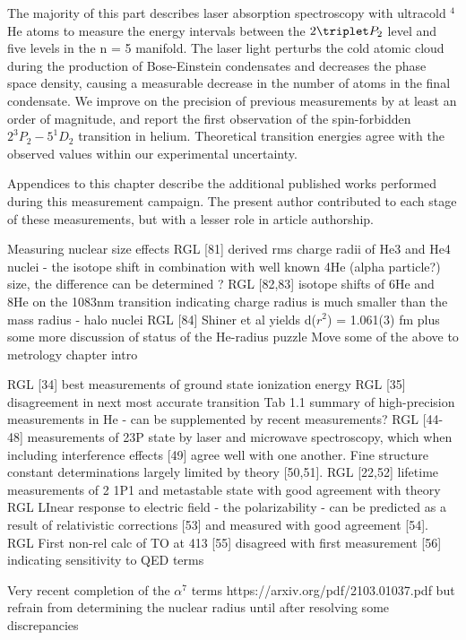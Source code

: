 The majority of this part describes laser absorption spectroscopy with ultracold $^4$He atoms to measure the energy intervals between the $2\triplet P_2$ level and five levels in the n = 5 manifold. The laser light perturbs the cold atomic cloud during the production of Bose-Einstein condensates and decreases the phase space density, causing a measurable decrease in the number of atoms in the final condensate. We improve on the precision of previous measurements by at least an order of magnitude, and report the first observation of the spin-forbidden $2^{3\!}P_2 - 5^{1\!}D_2$ transition in helium. Theoretical transition energies agree with the observed values within our experimental uncertainty.

Appendices to this chapter describe the additional published works performed during this measurement campaign. The present author contributed to each stage of these measurements, but with a lesser role in article authorship.

Measuring nuclear size effects
			RGL [81] derived rms charge radii of He3 and He4 nuclei - the isotope shift in combination with well known 4He (alpha particle?) size, the difference can be determined ? 
			RGL [82,83] isotope shifts of 6He and 8He on the 1083nm transition indicating charge radius is much smaller than the mass radius - halo nuclei 
			RGL [84] Shiner et al yields d($r^2$) = 1.061(3) fm 
			plus some more discussion of status of the He-radius puzzle 
			Move some of the above to metrology chapter intro

						RGL [34] best measurements of ground state ionization energy 
			RGL [35] disagreement in next most accurate transition 
			    Tab 1.1 summary of high-precision measurements in He - can be supplemented by recent measurements?
			RGL [44-48] measurements of 23P state by laser and microwave spectroscopy, which when including interference effects [49] agree well with one another. Fine structure constant determinations largely limited by theory [50,51]. 
			RGL [22,52] lifetime measurements of 2 1P1 and metastable state with good agreement with theory 
			RGL LInear response to electric field - the polarizability - can be predicted as a result of relativistic corrections [53] and measured with good agreement [54].  
			RGL First non-rel calc of TO at 413 [55] disagreed with first measurement [56] indicating sensitivity to QED terms 

Very recent completion of the $\alpha^7$ terms https://arxiv.org/pdf/2103.01037.pdf but refrain from determining the nuclear radius until after resolving some discrepancies


